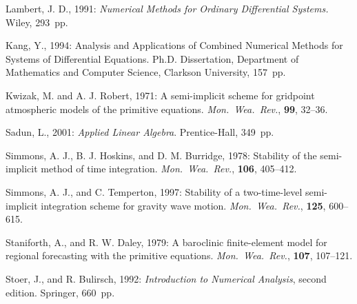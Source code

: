 \documentclass[12pt]{article}
\begin{document}
\begin{thebibliography}{99}
Lambert, J. D., 1991: 
\textsl{Numerical Methods for Ordinary Differential Systems.}
Wiley, 293~pp.

Kang, Y., 1994:
Analysis and Applications of Combined Numerical Methods 
for Systems of Differential Equations.
Ph.D. Dissertation, Department of Mathematics and Computer Science,
Clarkson University, 157~pp.

Kwizak, M. and A. J. Robert, 1971:
A semi-implicit scheme for gridpoint atmospheric models of the primitive
equations.
\textsl{Mon.\ Wea.\ Rev.}, \textbf{99}, 32--36.


Sadun, L., 2001:
\textsl{Applied Linear Algebra}.
Prentice-Hall, 349~pp.

Simmons, A. J., B. J. Hoskins, and D. M. Burridge, 1978:
Stability of the semi-implicit method of time integration.
\textsl{Mon.\ Wea.\ Rev.}, \textbf{106}, 405--412.

Simmons, A. J., and C. Temperton, 1997:
Stability of a two-time-level semi-implicit integration scheme for gravity
wave motion.
\textsl{Mon.\ Wea.\ Rev.}, \textbf{125}, 600--615.

Staniforth, A., and R. W. Daley, 1979:
A baroclinic finite-element model for regional forecasting with the primitive
equations.
\textsl{Mon.\ Wea.\ Rev.}, \textbf{107}, 107--121.

Stoer, J., and R. Bulirsch, 1992:
\textsl{Introduction to Numerical Analysis}, second edition.
Springer, 660~pp.

\end{thebibliography}

\end{document}
